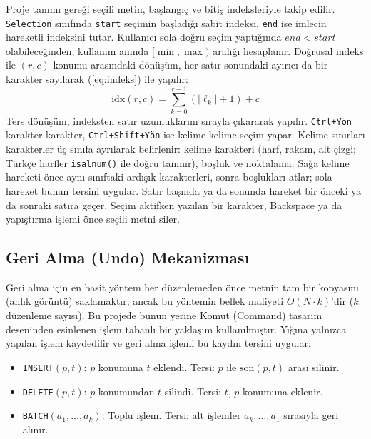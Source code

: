 \documentclass[conference,a4paper]{IEEEtran}
\newcommand{\kod}[1]{\texttt{#1}}
\begin{document}
Proje tanımı gereği seçili metin, başlangıç ve bitiş indeksleriyle takip edilir. \kod{Selection} sınıfında \kod{start} seçimin başladığı sabit indeksi, \kod{end} ise imlecin hareketli indeksini tutar. Kullanıcı sola doğru seçim yaptığında $\mathit{end} < \mathit{start}$ olabileceğinden, kullanım anında $[\min, \max)$ aralığı hesaplanır. Doğrusal indeks ile $(r,c)$ konumu arasındaki dönüşüm, her satır sonundaki ayırıcı da bir karakter sayılarak (\ref{eq:indeks}) ile yapılır:
\begin{equation}
\mathrm{idx}(r,c) = \sum_{k=0}^{r-1}\left(|\ell_k| + 1\right) + c
\label{eq:indeks}
\end{equation}
Ters dönüşüm, indeksten satır uzunluklarını sırayla çıkararak yapılır. \kod{Ctrl+Yön} karakter karakter, \kod{Ctrl+Shift+Yön} ise kelime kelime seçim yapar. Kelime sınırları karakterler üç sınıfa ayrılarak belirlenir: kelime karakteri (harf, rakam, alt çizgi; Türkçe harfler \kod{isalnum()} ile doğru tanınır), boşluk ve noktalama. Sağa kelime hareketi önce aynı sınıftaki ardışık karakterleri, sonra boşlukları atlar; sola hareket bunun tersini uygular. Satır başında ya da sonunda hareket bir önceki ya da sonraki satıra geçer. Seçim aktifken yazılan bir karakter, Backspace ya da yapıştırma işlemi önce seçili metni siler.

\subsection{Geri Alma (Undo) Mekanizması}

Geri alma için en basit yöntem her düzenlemeden önce metnin tam bir kopyasını (anlık görüntü) saklamaktır; ancak bu yöntemin bellek maliyeti $O(N \cdot k)$'dir ($k$: düzenleme sayısı). Bu projede bunun yerine Komut (Command) tasarım deseninden \cite{gof} esinlenen işlem tabanlı bir yaklaşım kullanılmıştır. Yığına yalnızca yapılan işlem kaydedilir ve geri alma işlemi bu kaydın tersini uygular:

\begin{itemize}
\item \kod{INSERT}$(p, t)$: $p$ konumuna $t$ eklendi. Tersi: $p$ ile $\mathrm{son}(p,t)$ arası silinir.
\item \kod{DELETE}$(p, t)$: $p$ konumundan $t$ silindi. Tersi: $t$, $p$ konumuna eklenir.
\item \kod{BATCH}$(a_1, \ldots, a_k)$: Toplu işlem. Tersi: alt işlemler $a_k, \ldots, a_1$ sırasıyla geri alınır.
\end{itemize}
\end{document}
